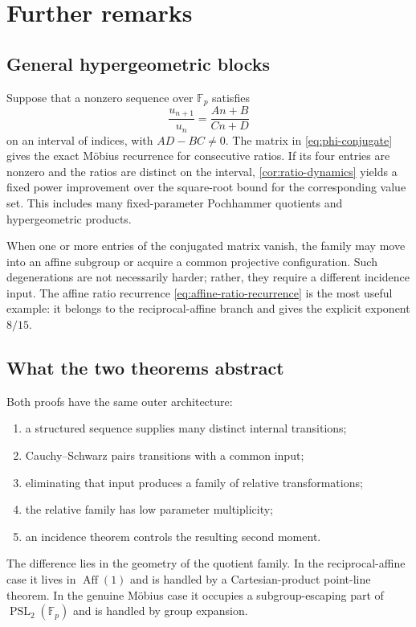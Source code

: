 \documentclass[11pt,reqno]{amsart}
\numberwithin{equation}{section}
\theoremstyle{definition}
\theoremstyle{remark}
\newcommand{\F}{\mathbb F}
\newcommand{\Aff}{\operatorname{Aff}}
\newcommand{\PSL}{\operatorname{PSL}}
\begin{document}
\section{Further remarks}

\subsection{General hypergeometric blocks}

Suppose that a nonzero sequence over $\F_p$ satisfies
\begin{equation}\label{eq:general-hypergeometric-final}
  \frac{u_{n+1}}{u_n}=\frac{An+B}{Cn+D}
\end{equation}
on an interval of indices, with $AD-BC\ne0$.  The matrix in \eqref{eq:phi-conjugate} gives the exact M\"obius recurrence for consecutive ratios.  If its four entries are nonzero and the ratios are distinct on the interval, \cref{cor:ratio-dynamics} yields a fixed power improvement over the square-root bound for the corresponding value set.  This includes many fixed-parameter Pochhammer quotients and hypergeometric products.

When one or more entries of the conjugated matrix vanish, the family may move into an affine subgroup or acquire a common projective configuration.  Such degenerations are not necessarily harder; rather, they require a different incidence input.  The affine ratio recurrence \eqref{eq:affine-ratio-recurrence} is the most useful example: it belongs to the reciprocal-affine branch and gives the explicit exponent $8/15$.

\subsection{What the two theorems abstract}

Both proofs have the same outer architecture:
\begin{enumerate}[label=(\roman*)]
  \item a structured sequence supplies many distinct internal transitions;
  \item Cauchy--Schwarz pairs transitions with a common input;
  \item eliminating that input produces a family of relative transformations;
  \item the relative family has low parameter multiplicity;
  \item an incidence theorem controls the resulting second moment.
\end{enumerate}
The difference lies in the geometry of the quotient family.  In the reciprocal-affine case it lives in $\Aff(1)$ and is handled by a Cartesian-product point-line theorem.  In the genuine M\"obius case it occupies a subgroup-escaping part of $\PSL_2(\F_p)$ and is handled by group expansion.
\end{document}
